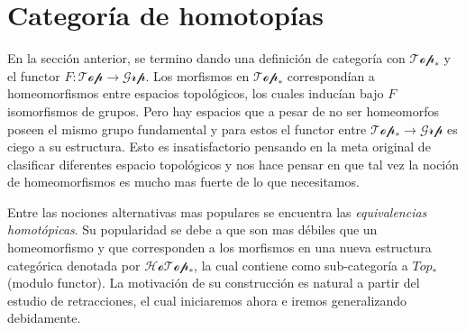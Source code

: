 \section{Categoría de homotopías}
En la sección anterior, se termino dando una definición de categoría con
\(\mathscr{Top}_*\) y el functor \(F : \mathscr{Top} \to
\mathscr{Grp}\). Los morfismos en \(\mathscr{Top}_*\) correspondían a
homeomorfismos entre espacios topológicos, los cuales inducían bajo
\(F\) isomorfismos de grupos. Pero hay espacios que a pesar de no
ser homeomorfos poseen el mismo grupo fundamental y para estos el
functor entre \(\mathscr{Top}_* \to \mathscr{Grp}\) es ciego a su
estructura. Esto es insatisfactorio pensando en la meta original de
clasificar diferentes espacio topológicos y nos hace pensar en que
tal vez la noción de homeomorfismos es mucho mas fuerte de lo que
necesitamos.

Entre las nociones alternativas mas populares se encuentra las
\emph{equivalencias homotópicas}. Su popularidad se debe a que son mas
débiles que un homeomorfismo y que corresponden a los morfismos en una
nueva estructura categórica denotada por \(\mathscr{HoTop}_*\), la cual
contiene como sub-categoría a \(Top_*\) (modulo functor). La motivación
de su construcción es natural a partir del estudio de retracciones, el
cual iniciaremos ahora e iremos generalizando debidamente.

